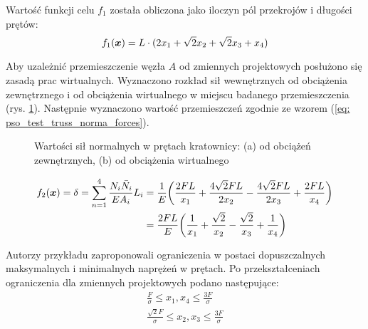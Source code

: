 Wartość funkcji celu $f_1$ została obliczona jako iloczyn pól przekrojów i długości prętów:
\begin{equation}
	f_1(\bm{x}) = L\cdot(2x_1+\sqrt{2}x_2+\sqrt{2}x_3+x_4)
\end{equation}

Aby uzależnić przemieszczenie węzła $A$ od zmiennych projektowych posłużono się zasadą prac wirtualnych. Wyznaczono rozkład sił wewnętrznych od obciążenia zewnętrznego i od obciążenia wirtualnego w miejscu badanego przemieszczenia (rys. \ref{fig: pso_testtruss_results}). Następnie wyznaczono wartość przemieszczeń zgodnie ze wzorem (\ref{eq: pso_test_truss_norma_forces}).

\begin{figure}[hbt!]
	\centering
	\captionsetup{justification=centering}
	\caption{Wartości sił normalnych w prętach kratownicy: (a) od obciążeń zewnętrznych, (b) od obciążenia wirtualnego}
	\label{fig: pso_testtruss_results}
\end{figure}

\begin{equation} \label{eq: pso_test_truss_norma_forces}
\begin{split}
	f_2(\bm{x}) =\delta= \sum_{n=1}^{4} \frac{N_i\bar{N}_i}{EA_i}L_i &=\frac{1}{E}\bigg(\frac{2FL}{x_1}+ \frac{4\sqrt{2}FL}{2x_2}- \frac{4\sqrt{2}FL}{2x_3}+\frac{2FL}{x_4}\bigg) \\
	&=\frac{2FL}{E}\bigg(\frac{1}{x_1}+\frac{\sqrt{2}}{x_2}-\frac{\sqrt{2}}{x_3}+\frac{1}{x_4}\bigg)
\end{split}
\end{equation}

\pagebreak[4]
Autorzy przykładu zaproponowali ograniczenia w postaci dopuszczalnych maksymalnych i minimalnych naprężeń w prętach. Po przekształceniach ograniczenia dla zmiennych projektowych podano następujące:
\begin{equation}
	\begin{split}
	\frac{F}{\sigma} \le x_1,x_4 \le \frac{3F}{\sigma}\\
	\frac{\sqrt{2}F}{\sigma} \le x_2,x_3 \le \frac{3F}{\sigma}
	\end{split}
\end{equation}

